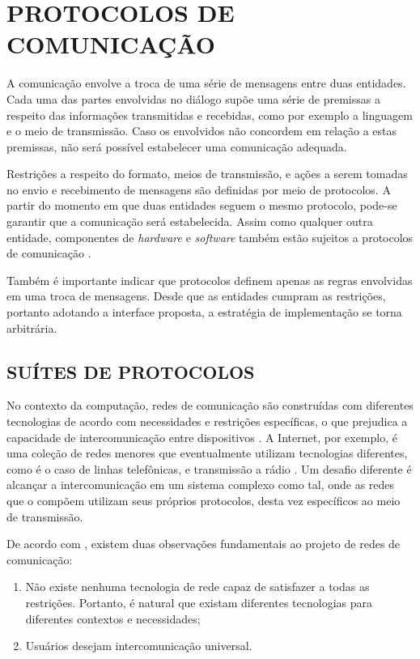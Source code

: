 \chapter{PROTOCOLOS DE COMUNICAÇÃO}

A comunicação envolve a troca de uma série de mensagens entre duas entidades. Cada
uma das partes envolvidas no diálogo supõe uma série de premissas a respeito das
informações transmitidas e recebidas, como por exemplo a linguagem e o meio de
transmissão. Caso os envolvidos não concordem em relação a estas premissas, não
será possível estabelecer uma comunicação adequada.

Restrições a respeito do formato, meios de transmissão, e ações a serem tomadas no
envio e recebimento de mensagens são definidas por meio de protocolos. A partir do
momento em que duas entidades seguem o mesmo protocolo, pode-se garantir que a
comunicação será estabelecida. Assim como qualquer outra entidade, componentes de
\textit{hardware} e \textit{software} também estão sujeitos a protocolos de
comunicação \cite{kurose2012}.

Também é importante indicar que protocolos definem apenas as regras envolvidas em
uma troca de mensagens. Desde que as entidades cumpram as restrições, portanto
adotando a interface proposta, a estratégia de implementação se torna arbitrária.



\section{SUÍTES DE PROTOCOLOS}

No contexto da computação, redes de comunicação são construídas com diferentes
tecnologias de acordo com necessidades e restrições específicas, o que prejudica a
capacidade de intercomunicação entre dispositivos \cite{comer2000}. A Internet, por
exemplo, é uma coleção de redes menores que eventualmente utilizam tecnologias
diferentes, como é o caso de linhas telefônicas, e transmissão a rádio
\cite{tanenbaum2010}. Um desafio diferente é alcançar a intercomunicação em um
sistema complexo como tal, onde as redes que o compõem utilizam seus próprios
protocolos, desta vez específicos ao meio de transmissão.

De acordo com \cite{comer2000}, existem duas observações fundamentais ao projeto de
redes de comunicação:

\begin{enumerate}
  \item{Não existe nenhuma tecnologia de rede capaz de satisfazer a todas as
        restrições. Portanto, é natural que existam diferentes tecnologias para
        diferentes contextos e necessidades;}
  \item{Usuários desejam intercomunicação universal.}
\end{enumerate}

